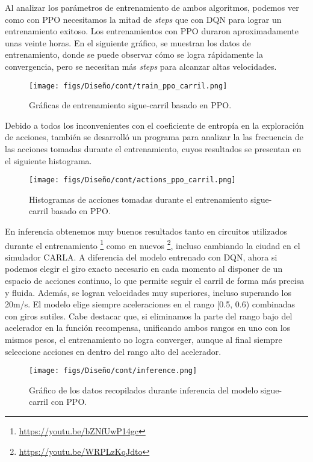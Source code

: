 \newpage

Al analizar los parámetros de entrenamiento de ambos algoritmos, podemos ver como con \ac{PPO} necesitamos la mitad de \textit{steps} que con \ac{DQN} para lograr un entrenamiento exitoso. Los entrenamientos con \ac{PPO} duraron aproximadamente unas veinte horas. En el siguiente gráfico, se muestran los datos de entrenamiento, donde se puede observar cómo se logra rápidamente la convergencia, pero se necesitan más \textit{steps} para alcanzar altas velocidades.
\begin{figure}[ht]
  \centering
  \texttt{[image: figs/Diseño/cont/train\_ppo\_carril.png]}
  \caption{Gráficas de entrenamiento sigue-carril basado en \ac{PPO}.}
  \label{fig:train_ppo_carril}
\end{figure}

Debido a todos los inconvenientes con el coeficiente de entropía en  la exploración de acciones, también se desarrolló un programa para analizar la las frecuencia de las acciones tomadas durante el entrenamiento, cuyos resultados se presentan en el siguiente histograma.
\begin{figure}[ht]
  \centering
  \texttt{[image: figs/Diseño/cont/actions\_ppo\_carril.png]}
  \caption{Histogramas de acciones tomadas durante el entrenamiento sigue-carril basado en \ac{PPO}.}
  \label{fig:actions_ppo_carril}
\end{figure}

\newpage

En inferencia obtenemos muy buenos resultados tanto en circuitos utilizados durante el entrenamiento \footnote{\url{https://youtu.be/bZNfUwP14gc}} como en nuevos \footnote{\url{https://youtu.be/WRPLzKqJdto}}, incluso cambiando la ciudad en el simulador CARLA. A diferencia del modelo entrenado con \ac{DQN}, ahora si podemos elegir el giro exacto necesario en cada momento al disponer de un espacio de acciones continuo, lo que permite seguir el carril de forma más precisa y fluida. Además, se logran velocidades muy superiores, incluso superando los 20m/s. El modelo elige siempre aceleraciones en el rango [0.5, 0.6) combinadas con giros sutiles. Cabe destacar que, si eliminamos la parte del rango bajo del acelerador en la función recompensa, unificando ambos rangos en uno con los mismos pesos, el entrenamiento no logra converger, aunque al final siempre seleccione acciones en dentro del rango alto del acelerador.
\begin{figure}[ht]
  \centering
  \texttt{[image: figs/Diseño/cont/inference.png]}
  \caption{Gráfico de los datos recopilados durante inferencia del modelo sigue-carril con \ac{PPO}.}
  \label{fig:inference_ppo_carril}
\end{figure}

